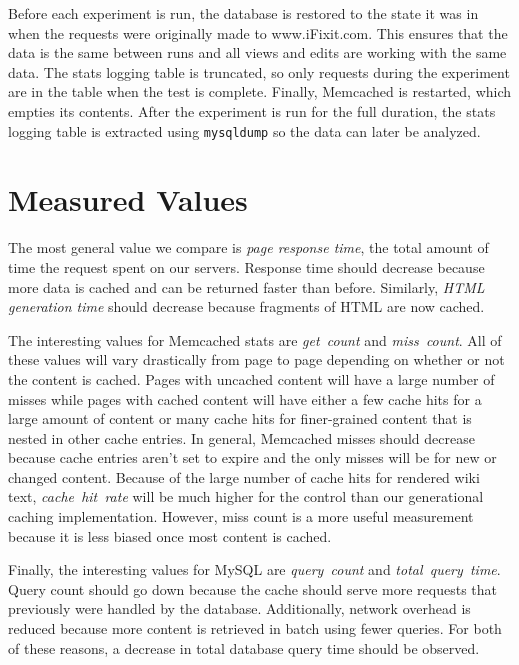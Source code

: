 \documentclass[12pt]{ucthesis}
\begin{document}
Before each experiment is run, the database is restored to the state it was in when the requests were originally made to \textsf{www.iFixit.com}.
This ensures that the data is the same between runs and all views and edits are working with the same data.
The stats logging table is truncated, so only requests during the experiment are in the table when the test is complete.
Finally, \textsf{Memcached} is restarted, which empties its contents.
After the experiment is run for the full duration, the stats logging table is extracted using {\tt mysqldump} so the data can later be analyzed.

\section{Measured Values}
The most general value we compare is \textit{page response time}, the total amount of time the request spent on our servers.
Response time should decrease because more data is cached and can be returned faster than before.
Similarly, \textit{HTML generation time} should decrease because fragments of HTML are now cached.

The interesting values for \textsf{Memcached} stats are \textit{get~count} and \textit{miss~count}.
All of these values will vary drastically from page to page depending on whether or not the content is cached.
Pages with uncached content will have a large number of misses while pages with cached content will have either a few cache hits for a large amount of content or many cache hits for finer-grained content that is nested in other cache entries.
In general, \textsf{Memcached} misses should decrease because cache entries aren't set to expire and the only misses will be for new or changed content.
Because of the large number of cache hits for rendered wiki text, \textit{cache~hit~rate} will be much higher for the control than our generational caching implementation.
However, miss count is a more useful measurement because it is less biased once most content is cached.

Finally, the interesting values for \textsf{MySQL} are \textit{query~count} and \textit{total~query~time}.
Query count should go down because the cache should serve more requests that previously were handled by the database.
Additionally, network overhead is reduced because more content is retrieved in batch using fewer queries.
For both of these reasons, a decrease in total database query time should be observed.
\end{document}
